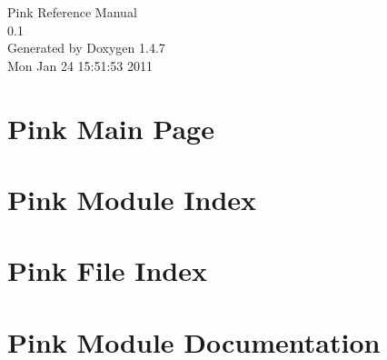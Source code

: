 \documentclass[a4paper]{book}
\begin{document}
\begin{titlepage}
\vspace*{7cm}
\begin{center}
{\Large Pink Reference Manual\\[1ex]\large 0.1 }\\
\vspace*{1cm}
{\large Generated by Doxygen 1.4.7}\\
\vspace*{0.5cm}
{\small Mon Jan 24 15:51:53 2011}\\
\end{center}
\end{titlepage}
\clearemptydoublepage
{}
\tableofcontents
\clearemptydoublepage
{}
\chapter{Pink Main Page}
\label{index}
\chapter{Pink Module Index}

\chapter{Pink File Index}

\chapter{Pink Module Documentation}














\end{document}
